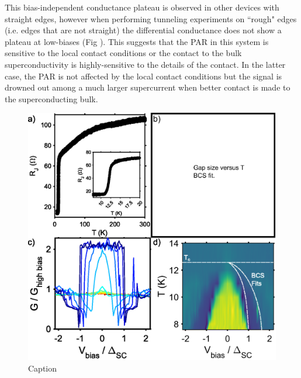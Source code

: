 This bias-independent conductance plateau is observed in other devices with straight edges, however when performing tunneling experiments on ``rough" edges (i.e. edges that are not straight) the differential conductance does not show a plateau at low-biases (Fig ). This suggests that the \ac{PAR} in this system is sensitive to the local contact conditions or the contact to the bulk superconductivity is highly-sensitive to the details of the contact. In the latter case, the \ac{PAR} is not affected by the local contact conditions but the signal is drowned out among a much larger supercurrent when better contact is made to the superconducting bulk. 
\begin{figure}[h]
    \centering
    \includegraphics[width = \textwidth]{Chap4/Figures/Temperature.eps}
    \caption{Caption}
    \label{fig:PARTemp}
\end{figure}

